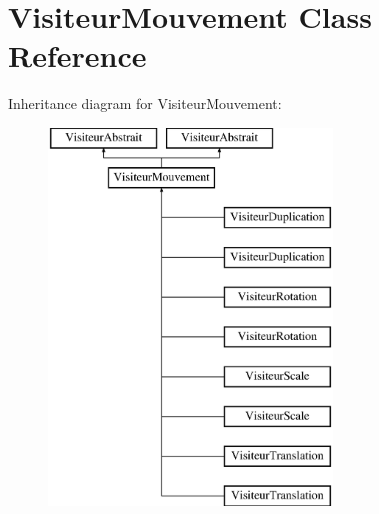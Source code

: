 \hypertarget{class_visiteur_mouvement}{\section{Visiteur\-Mouvement Class Reference}
\label{class_visiteur_mouvement}
}
Inheritance diagram for Visiteur\-Mouvement\-:\begin{figure}[H]
\begin{center}
\leavevmode
\includegraphics[height=10.000000cm]{class_visiteur_mouvement}
\end{center}
\end{figure}
